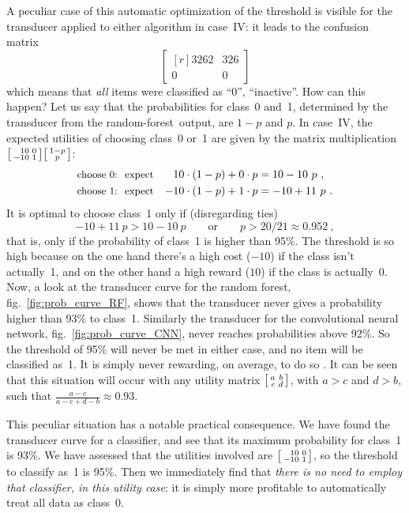 \documentclass[\ifafour a4paper,12pt,\else a5paper,10pt,\fi%
onecolumn,oneside,article,%
british%
]{memoir}
\theoremstyle{remark}
\theoremstyle{innote}
\newcommand*{\p}{\mathrm{p}}%
\renewcommand*{\|}[1][]{\nonscript\:#1\vert\nonscript\:\mathopen{}}
\newcommand*{\fig}{fig.}%
\newcommand*{\cf}{{cf.}}
\newcommand*{\texts}[1]{\text{\small #1}}
\newcommand*{\RF}{random forest}
\newcommand*{\rf}{random-forest}
\newcommand*{\CNN}{convolutional neural network}
\newcommand*{\umatrix}[4]{\begin{bmatrix*}[r]#1&#2\\#3&#4\end{bmatrix*}}
\newcommand*{\sumatrix}[4]{\begin{bsmallmatrix*}[r]#1&#2\\#3&#4\end{bsmallmatrix*}}
\begin{document}
A peculiar case of this automatic optimization of the threshold is visible for the transducer applied to either algorithm in case~IV: it leads to the confusion matrix
\begin{equation}
  \label{eq:peculiar_CM}
  \umatrix{3262}{326}{0}{0}
\end{equation}
which means that \emph{all} items were classified as \enquote{0}, \enquote{inactive}. How can this happen? Let us say that the probabilities for class~0 and~1, determined by the transducer from the \rf\ output, are $1-p$ and $p$. In case~IV, the expected utilities of choosing class~0 or~1 are given by the matrix multiplication $\sumatrix{10}{0}{-10}{1} \begin{bsmallmatrix}1-p\\p\end{bsmallmatrix}$:
\begin{equation}
  \label{eq:expe_utilities_peculiar}
  \begin{aligned}
    \texts{choose 0:\; expect}&& 10 \cdot (1-p) + 0 \cdot p &= 10 - 10\ p \ ,
                                                            \\
    \texts{choose 1:\; expect}&& -10 \cdot (1-p) + 1 \cdot p &= -10 + 11\ p \ .
  \end{aligned}
\end{equation}
It is optimal to choose class~1 only if (disregarding ties)
\begin{equation}
  \label{eq:when_choose_0}
  -10 + 11\ p > 10 - 10\ p
  \qquad\text{or}\qquad
  p > 20/21 \approx 0.952 \ ,
\end{equation}
that is, only if the probability of class~1 is higher than 95\%. The threshold is so high because on the one hand there's a high cost ($-10$) if the class isn't actually~1, and on the other hand a high reward ($10$) if the class is actually~0. Now, a look at the transducer curve for the \RF, \fig~\ref{fig:prob_curve_RF}, shows that the transducer never gives a probability higher than 93\% to class~1. Similarly the transducer for the \CNN, \fig~\ref{fig:prob_curve_CNN}, never reaches probabilities above 92\%. So the threshold of 95\% will never be met in either case, and no item will be classified as~1. It is simply never rewarding, on average, to do so \autocites[\cf\ the analysis by]{drummondetal2005}. It can be seen that this situation will occur with any utility matrix $\sumatrix{a}{b}{c}{d}$, with $a>c$ and $d>b$, such that $\frac{a-c}{a-c+d-b}\approx 0.93$.

This peculiar situation has a notable practical consequence. We have found the transducer curve for a classifier, and see that its maximum probability for class~1 is 93\%. We have assessed that the utilities involved are $\sumatrix{10}{0}{-10}{1}$, so the threshold to classify as~1 is 95\%. Then we immediately find that \emph{there is no need to employ that classifier, in this utility case}: it is simply more profitable to automatically treat all data as class~0.
\end{document}
